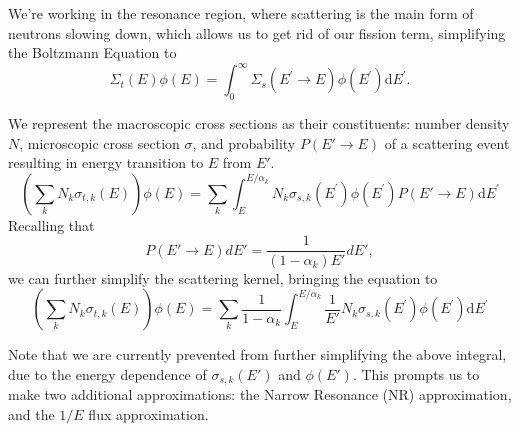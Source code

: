 \documentclass[10pt]{article}
\begin{document}
We're working in the resonance region, where scattering is the main form of neutrons slowing down, which allows us to get rid of our fission term, simplifying the Boltzmann Equation to
\begin{equation}\Sigma_{t}(E)\phi(E)=\int_{0}^{\infty}\Sigma_{s}\left(E^{\prime}\rightarrow E\right)\phi\left(E^{\prime}\right)\mathrm{d}E^{\prime}.\end{equation}

We represent the macroscopic cross sections as their constituents: number density $N$, microscopic cross section $\sigma$, and probability $P(E'\rightarrow E)$ of a scattering event resulting in energy transition to $E$ from $E'$.
\begin{equation}\left(\sum\limits_{k}N_{k}\sigma_{t,k}(E)\right)\phi(E)=\sum\limits_{k}\int_{E}^{E/\alpha_{k}}N_{k}\sigma_{s,k}\left(E^{\prime}\right)\phi\left(E^{\prime}\right)P(E'\rightarrow E)\mathrm{d}E^{\prime}\end{equation}
Recalling that 
\begin{equation}P(E'\rightarrow E)dE'=\frac{1}{(1-\alpha_k)E'}dE',\label{eq:probs}\end{equation}
we can further simplify the scattering kernel, bringing the equation to
\begin{equation}\left(\sum\limits_{k}N_{k}\sigma_{t,k}(E)\right)\phi(E)=\sum\limits_{k}\frac{1}{1-\alpha_{k}}\int_{E}^{E/\alpha_{k}}\frac{1}{E'}N_{k}\sigma_{s,k}\left(E^{\prime}\right)\phi\left(E^{\prime}\right)\mathrm{d}E^{\prime}\end{equation}


Note that we are currently prevented from further simplifying the above integral, due to the energy dependence of $\sigma_{s,k}(E')$ and $\phi(E')$. This prompts us to make two additional approximations: the Narrow Resonance (NR) approximation, and the $1/E$ flux approximation.\par
\end{document}
